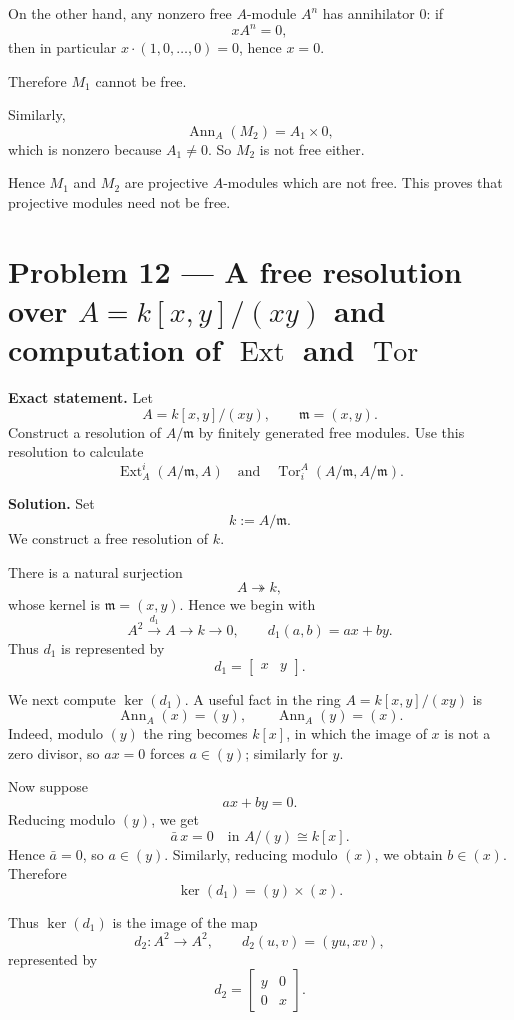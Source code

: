 \documentclass[12pt,a4paper,oneside]{report}
\theoremstyle{notespace}
\begin{document}
On the other hand, any nonzero free \(A\)-module \(A^n\) has annihilator \(0\): if
\[
xA^n=0,
\]
then in particular \(x\cdot (1,0,\dots,0)=0\), hence \(x=0\).

Therefore \(M_1\) cannot be free.

Similarly,
\[
\operatorname{Ann}_A(M_2)=A_1\times 0,
\]
which is nonzero because \(A_1\neq 0\). So \(M_2\) is not free either.

Hence \(M_1\) and \(M_2\) are projective \(A\)-modules which are not free. This proves that projective modules need not be free.	
	
	
\section{Problem 12 --- A free resolution over \texorpdfstring{$A=k[x,y]/(xy)$}{A = k[x,y]/(xy)} and computation of \texorpdfstring{$\operatorname{Ext}$}{Ext} and \texorpdfstring{$\operatorname{Tor}$}{Tor}}

\textbf{Exact statement.}
Let
\[
A=k[x,y]/(xy),\qquad \mathfrak m=(x,y).
\]
Construct a resolution of \(A/\mathfrak m\) by finitely generated free modules. Use this resolution to calculate
\[
\operatorname{Ext}_A^i(A/\mathfrak m,A)
\quad\text{and}\quad
\operatorname{Tor}_i^A(A/\mathfrak m,A/\mathfrak m).
\]

\textbf{Solution.}
Set
\[
k:=A/\mathfrak m.
\]
We construct a free resolution of \(k\).

There is a natural surjection
\[
A\twoheadrightarrow k,
\]
whose kernel is \(\mathfrak m=(x,y)\). Hence we begin with
\[
A^2 \xrightarrow{d_1} A \to k \to 0,
\qquad
d_1(a,b)=ax+by.
\]
Thus \(d_1\) is represented by
\[
d_1=\begin{bmatrix}x&y\end{bmatrix}.
\]

We next compute \(\ker(d_1)\). A useful fact in the ring \(A=k[x,y]/(xy)\) is
\[
\operatorname{Ann}_A(x)=(y),
\qquad
\operatorname{Ann}_A(y)=(x).
\]
Indeed, modulo \((y)\) the ring becomes \(k[x]\), in which the image of \(x\) is not a zero divisor, so \(ax=0\) forces \(a\in (y)\); similarly for \(y\).

Now suppose
\[
ax+by=0.
\]
Reducing modulo \((y)\), we get
\[
\bar a\,x=0 \quad\text{in } A/(y)\cong k[x].
\]
Hence \(\bar a=0\), so \(a\in (y)\). Similarly, reducing modulo \((x)\), we obtain \(b\in (x)\). Therefore
\[
\ker(d_1)=(y)\times (x).
\]

Thus \(\ker(d_1)\) is the image of the map
\[
d_2:A^2\to A^2,
\qquad
d_2(u,v)=(yu,xv),
\]
represented by
\[
d_2=
\begin{bmatrix}
	y&0\\
	0&x
\end{bmatrix}.
\]
\end{document}
